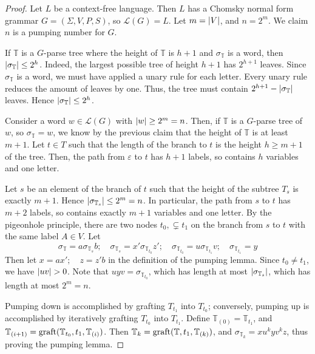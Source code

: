 \begin{proof}
	Let \( L \) be a context-free language.
	Then \( L \) has a Chomsky normal form grammar \( G = (\Sigma, V, P, S) \), so \( \mathcal L(G) = L \).
	Let \( m = \abs{V} \), and \( n = 2^m \).
	We claim \( n \) is a pumping number for \( G \).

	If \( \mathbb T \) is a \( G \)-parse tree where the height of \( \mathbb T \) is \( h + 1 \) and \( \sigma_{\mathbb T} \) is a word, then \( \abs{\sigma_{\mathbb T}} \leq 2^h \).
	Indeed, the largest possible tree of height \( h + 1 \) has \( 2^{h + 1} \) leaves.
	Since \( \sigma_{\mathbb T} \) is a word, we must have applied a unary rule for each letter.
	Every unary rule reduces the amount of leaves by one.
	Thus, the tree must contain \( 2^{h+1} - \abs{\sigma_{\mathbb T}} \) leaves.
	Hence \( \abs{\sigma_{\mathbb T}} \leq 2^h \).

	Consider a word \( w \in \mathcal L(G) \) with \( \abs{w} \geq 2^m = n \).
	Then, if \( \mathbb T \) is a \( G \)-parse tree of \( w \), so \( \sigma_{\mathbb T} = w \), we know by the previous claim that the height of \( \mathbb T \) is at least \( m + 1 \).
	Let \( t \in T \) such that the length of the branch to \( t \) is the height \( h \geq m + 1 \) of the tree.
	Then, the path from \( \varepsilon \) to \( t \) has \( h + 1 \) labels, so contains \( h \) variables and one letter.

	Let \( s \) be an element of the branch of \( t \) such that the height of the subtree \( T_s \) is exactly \( m + 1 \).
	Hence \( \abs{\sigma_{\mathbb T_s}} \leq 2^m = n \).
	In particular, the path from \( s \) to \( t \) has \( m + 2 \) labels, so contains exactly \( m + 1 \) variables and one letter.
	By the pigeonhole principle, there are two nodes \( t_0, \subsetneq t_1 \) on the branch from \( s \) to \( t \) with the same label \( A \in V \).
	Let
	\[ \sigma_{\mathbb T} = a\sigma_{\mathbb T_s} b;\quad \sigma_{\mathbb T_s} = x' \sigma_{\mathbb T_{t_0}} z';\quad \sigma_{\mathbb T_{t_0}} = u \sigma_{\mathbb T_{t_1}} v;\quad \sigma_{\mathbb T_{t_1}} = y \]
	Then let \( x = ax';\quad z = z'b \) in the definition of the pumping lemma.
	Since \( t_0 \neq t_1 \), we have \( \abs{uv} > 0 \).
	Note that \( uyv = \sigma_{\mathbb T_{t_0}} \), which has length at most \( \abs{\sigma_{\mathbb T_s}} \), which has length at most \( 2^m = n \).

	Pumping down is accomplished by grafting \( T_{t_1} \) into \( T_{t_0} \); conversely, pumping up is accomplished by iteratively grafting \( T_{t_0} \) into \( T_{t_1} \).
	Define \( \mathbb T_{(0)} = \mathbb T_{t_1} \), and \( \mathbb T_{(i+1)} = \operatorname{graft}(\mathbb T_{t_0}, t_1, \mathbb T_{(i)}) \).
	Then \( \mathbb T_k = \operatorname{graft}(\mathbb T, t_1, \mathbb T_{(k)}) \), and \( \sigma_{\mathbb T_k} = xu^kyv^kz \), thus proving the pumping lemma.
\end{proof}
